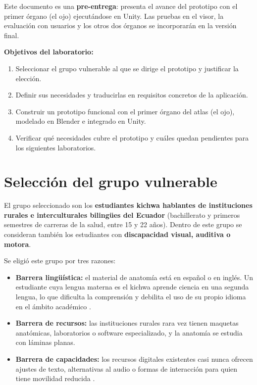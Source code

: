 \documentclass[11pt,a4paper]{article}
\begin{document}
Este documento es una \textbf{pre-entrega}: presenta el avance del prototipo con el primer órgano (el ojo) ejecutándose en Unity. Las pruebas en el visor, la evaluación con usuarios y los otros dos órganos se incorporarán en la versión final.

\textbf{Objetivos del laboratorio:}
\begin{enumerate}
    \item Seleccionar el grupo vulnerable al que se dirige el prototipo y justificar la elección.
    \item Definir sus necesidades y traducirlas en requisitos concretos de la aplicación.
    \item Construir un prototipo funcional con el primer órgano del atlas (el ojo), modelado en Blender e integrado en Unity.
    \item Verificar qué necesidades cubre el prototipo y cuáles quedan pendientes para los siguientes laboratorios.
\end{enumerate}

\section{Selección del grupo vulnerable}
El grupo seleccionado son los \textbf{estudiantes kichwa hablantes de instituciones rurales e interculturales bilingües del Ecuador} (bachillerato y primeros semestres de carreras de la salud, entre 15 y 22 años). Dentro de este grupo se consideran también los estudiantes con \textbf{discapacidad visual, auditiva o motora}.

Se eligió este grupo por tres razones:
\begin{itemize}
    \item \textbf{Barrera lingüística:} el material de anatomía está en español o en inglés. Un estudiante cuya lengua materna es el kichwa aprende ciencia en una segunda lengua, lo que dificulta la comprensión y debilita el uso de su propio idioma en el ámbito académico \cite{constitucion}.
    \item \textbf{Barrera de recursos:} las instituciones rurales rara vez tienen maquetas anatómicas, laboratorios o software especializado, y la anatomía se estudia con láminas planas.
    \item \textbf{Barrera de capacidades:} los recursos digitales existentes casi nunca ofrecen ajustes de texto, alternativas al audio o formas de interacción para quien tiene movilidad reducida \cite{wcag22}.
\end{itemize}
\end{document}
